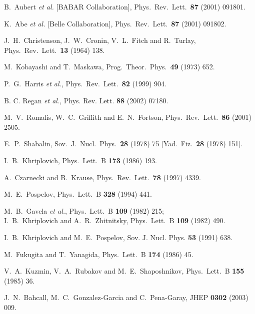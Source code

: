 \begin{thebibliography}{99}

B.~Aubert {\it et al.}  [BABAR Collaboration],
Phys.\ Rev.\ Lett.\  {\bf 87} (2001) 091801.

K.~Abe {\it et al.}  [Belle Collaboration],
Phys.\ Rev.\ Lett.\  {\bf 87} (2001) 091802.

J.~H.~Christenson, J.~W.~Cronin, V.~L.~Fitch and R.~Turlay,
Phys.\ Rev.\ Lett.\  {\bf 13} (1964) 138.

 M.~Kobayashi and T.~Maskawa,
Prog.\ Theor.\ Phys.\  {\bf 49} (1973) 652.

 P.~G.~Harris {\it et al.},
Phys.\ Rev.\ Lett.\  {\bf 82} (1999) 904.

B. C. Regan {\em et al.},  Phys. Rev. Lett. {\bf 88} (2002) 07180.

 M.~V.~Romalis, W.~C.~Griffith and E.~N.~Fortson,
Phys.\ Rev.\ Lett.\  {\bf 86} (2001) 2505.

E.~P.~Shabalin,
Sov.\ J.\ Nucl.\ Phys.\  {\bf 28} (1978) 75 [Yad.\
Fiz.\  {\bf 28} (1978) 151].

 I.~B.~Khriplovich,
Phys.\ Lett.\ B {\bf 173} (1986) 193.

 A.~Czarnecki and B.~Krause,
Phys.\ Rev.\ Lett.\  {\bf 78} (1997) 4339.

 M.~E.~Pospelov,
Phys.\ Lett.\ B {\bf 328} (1994) 441.

M.~B.~Gavela {\em et al.},
Phys.\ Lett.\ B {\bf 109} (1982) 215; \\
I.~B.~Khriplovich and
A.~R.~Zhitnitsky, Phys.\ Lett.\ B {\bf 109} (1982) 490.

 I.~B.~Khriplovich and M.~E.~Pospelov,
Sov. J. Nucl. Phys. {\bf 53} (1991) 638.

 M.~Fukugita and T.~Yanagida,
Phys.\ Lett.\ B {\bf 174} (1986) 45.

 V.~A.~Kuzmin, V.~A.~Rubakov and M.~E.~Shaposhnikov,
Phys.\ Lett.\ B {\bf 155} (1985) 36.


 J.~N.~Bahcall, M.~C.~Gonzalez-Garcia and C.~Pena-Garay,
JHEP {\bf 0302} (2003) 009.


\end{thebibliography}
